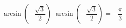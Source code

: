  {$\arcsin \left( -\dfrac{\sqrt{3}}{2} \right)$}
{ $\arcsin \left( -\dfrac{\sqrt{3}}{2} \right) = -\dfrac{\pi}{3}$}
